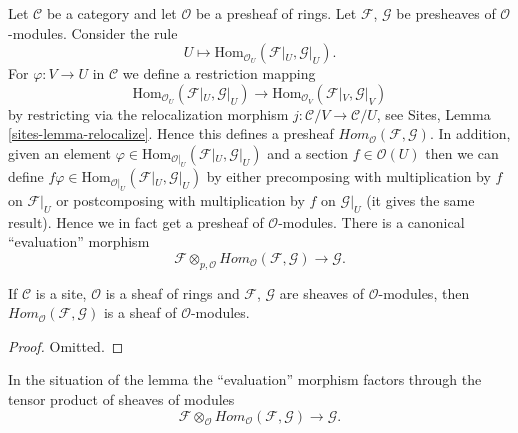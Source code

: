 \medskip\noindent
Let $\mathcal{C}$ be a category and let $\mathcal{O}$ be a presheaf
of rings. Let $\mathcal{F}$, $\mathcal{G}$ be presheaves of
$\mathcal{O}$-modules. Consider the rule
$$
U \longmapsto \text{Hom}_{\mathcal{O}_U}(\mathcal{F}|_U, \mathcal{G}|_U).
$$
For $\varphi : V \to U$ in $\mathcal{C}$ we define a restriction mapping
$$
\text{Hom}_{\mathcal{O}_U}(\mathcal{F}|_U, \mathcal{G}|_U)
\longrightarrow
\text{Hom}_{\mathcal{O}_V}(\mathcal{F}|_V, \mathcal{G}|_V)
$$
by restricting via the relocalization morphism
$j : \mathcal{C}/V \to \mathcal{C}/U$, see
Sites, Lemma \ref{sites-lemma-relocalize}. Hence this defines a
presheaf $\textit{Hom}_{\mathcal{O}}(\mathcal{F}, \mathcal{G})$.
In addition, given an element
$\varphi \in \text{Hom}_{\mathcal{O}|_U}(\mathcal{F}|_U, \mathcal{G}|_U)$
and a section $f \in \mathcal{O}(U)$ then we can define
$f\varphi \in \text{Hom}_{\mathcal{O}|_U}(\mathcal{F}|_U, \mathcal{G}|_U)$
by either precomposing with multiplication by $f$ on $\mathcal{F}|_U$
or postcomposing with multiplication by $f$ on $\mathcal{G}|_U$ (it gives
the same result). Hence we in fact get a presheaf of $\mathcal{O}$-modules.
There is a canonical ``evaluation'' morphism
$$
\mathcal{F}
\otimes_{p, \mathcal{O}}
\textit{Hom}_{\mathcal{O}}(\mathcal{F}, \mathcal{G})
\longrightarrow
\mathcal{G}.
$$

\begin{lemma}
\label{lemma-internal-hom}
If $\mathcal{C}$ is a site, $\mathcal{O}$ is a sheaf of rings
and $\mathcal{F}$, $\mathcal{G}$ are sheaves of
$\mathcal{O}$-modules, then
$\textit{Hom}_{\mathcal{O}}(\mathcal{F}, \mathcal{G})$
is a sheaf of $\mathcal{O}$-modules.
\end{lemma}

\begin{proof}
Omitted.
\end{proof}

\noindent
In the situation of the lemma the ``evaluation'' morphism
factors through the tensor product of sheaves of modules
$$
\mathcal{F}
\otimes_\mathcal{O}
\textit{Hom}_{\mathcal{O}}(\mathcal{F}, \mathcal{G})
\longrightarrow
\mathcal{G}.
$$

